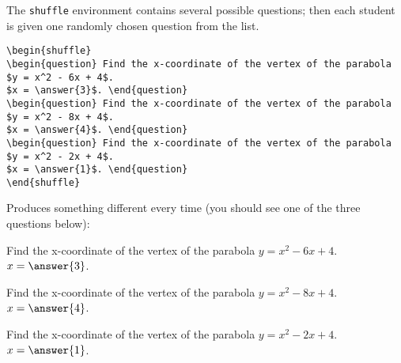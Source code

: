 \documentclass{ximera}
\begin{document}
\begin{example} The \verb!shuffle! environment contains several possible questions; then each student is given one randomly chosen question from the list.

\begin{verbatim}
\begin{shuffle}
\begin{question} Find the x-coordinate of the vertex of the parabola $y = x^2 - 6x + 4$. 
$x = \answer{3}$. \end{question}
\begin{question} Find the x-coordinate of the vertex of the parabola $y = x^2 - 8x + 4$. 
$x = \answer{4}$. \end{question}
\begin{question} Find the x-coordinate of the vertex of the parabola $y = x^2 - 2x + 4$. 
$x = \answer{1}$. \end{question}
\end{shuffle}
\end{verbatim}

Produces something different every time (you should see one of the three questions below):

\begin{shuffle}
\begin{question} Find the x-coordinate of the vertex of the parabola $y = x^2 - 6x + 4$. 
$x = \answer{3}$. \end{question}
\begin{question} Find the x-coordinate of the vertex of the parabola $y = x^2 - 8x + 4$. 
$x = \answer{4}$. \end{question}
\begin{question} Find the x-coordinate of the vertex of the parabola $y = x^2 - 2x + 4$. 
$x = \answer{1}$. \end{question}
\end{shuffle}

\end{example}
\end{document}
